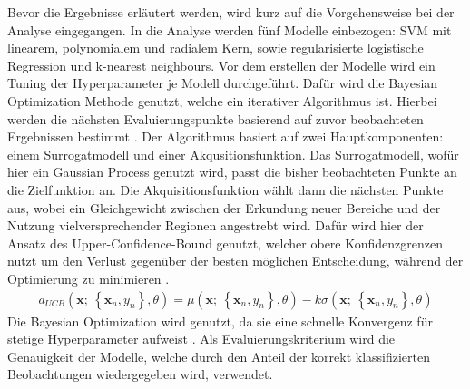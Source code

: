 \documentclass[
]{article}
\begin{document}
Bevor die Ergebnisse erläutert werden, wird kurz auf die Vorgehensweise
bei der Analyse eingegangen. In die Analyse werden fünf Modelle
einbezogen: SVM mit linearem, polynomialem und radialem Kern, sowie
regularisierte logistische Regression und k-nearest neighbours.\newline
Vor dem erstellen der Modelle wird ein Tuning der Hyperparameter je
Modell durchgeführt. Dafür wird die Bayesian Optimization Methode
genutzt, welche ein iterativer Algorithmus ist. Hierbei werden die
nächsten Evaluierungspunkte basierend auf zuvor beobachteten Ergebnissen
bestimmt \parencite{yangHyperparameterOptimizationMachine2020}. Der
Algorithmus basiert auf zwei Hauptkomponenten: einem Surrogatmodell und
einer Akqusitionsfunktion. Das Surrogatmodell, wofür hier ein Gaussian
Process genutzt wird, passt die bisher beobachteten Punkte an die
Zielfunktion an. Die Akquisitionsfunktion wählt dann die nächsten Punkte
aus, wobei ein Gleichgewicht zwischen der Erkundung neuer Bereiche und
der Nutzung vielversprechender Regionen angestrebt wird. Dafür wird hier
der Ansatz des Upper-Confidence-Bound genutzt, welcher obere
Konfidenzgrenzen nutzt um den Verlust gegenüber der besten möglichen
Entscheidung, während der Optimierung zu minimieren
\parencite{snoekPracticalBayesianOptimization2012}. \begin{align}
a_{UCB}(\mathbf{x};~\left\{\mathbf{x}_n,y_n\right\},\theta) = \mu(\mathbf{x};~\left\{\mathbf{x}_n,y_n\right\},\theta) - k \sigma(\mathbf{x};~\left\{\mathbf{x}_n,y_n\right\},\theta)
\end{align} Die Bayesian Optimization wird genutzt, da sie eine schnelle
Konvergenz für stetige Hyperparameter aufweist
\parencite{yangHyperparameterOptimizationMachine2020}. Als
Evaluierungskriterium wird die Genauigkeit der Modelle, welche durch den
Anteil der korrekt klassifizierten Beobachtungen wiedergegeben wird,
verwendet.
\end{document}
